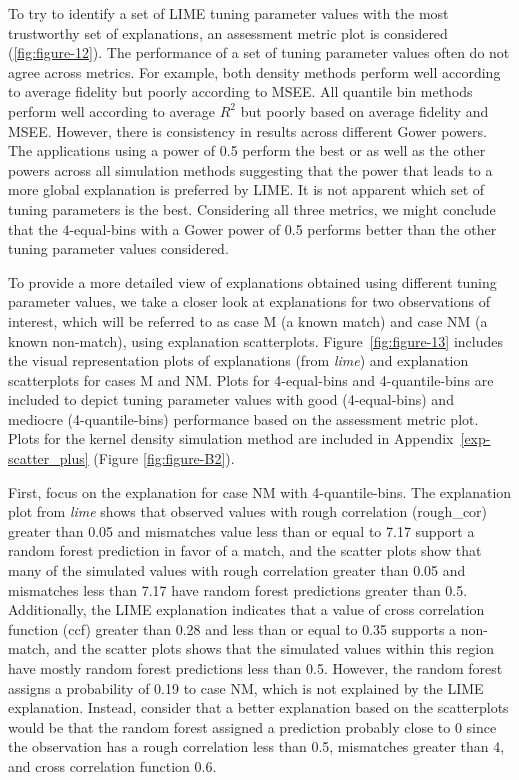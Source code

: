 \documentclass[AMS,STIX2COL]{WileyNJD-v2}\usepackage[]{graphicx}\usepackage[]{color}
\begin{document}
To try to identify a set of LIME tuning parameter values with the most trustworthy set of explanations, an assessment metric plot is considered (\autoref{fig:figure-12}). The performance of a set of tuning parameter values often do not agree across metrics. For example, both density methods perform well according to average fidelity but poorly according to MSEE. All quantile bin methods perform well according to average $R^2$ but poorly based on average fidelity and MSEE. However, there is consistency in results across different Gower powers. The applications using a power of 0.5 perform the best or as well as the other powers across all simulation methods suggesting that the power that leads to a more global explanation is preferred by LIME.  It is not apparent which set of tuning parameters is the best. Considering all three metrics, we might conclude that the 4-equal-bins with a Gower power of 0.5 performs better than the other tuning parameter values considered.

To provide a more detailed view of explanations obtained using different tuning parameter values, we take a closer look at explanations for two observations of interest, which will be referred to as case M (a known match) and case NM (a known non-match), using explanation scatterplots. Figure~\ref{fig:figure-13} includes the visual representation plots of explanations (from \emph{lime}) and explanation scatterplots for cases M and NM. Plots for 4-equal-bins and 4-quantile-bins are included to depict tuning parameter values with good (4-equal-bins) and mediocre (4-quantile-bins) performance based on the assessment metric plot. Plots for the kernel density simulation method are included in Appendix~\ref{exp-scatter_plus} (Figure \ref{fig:figure-B2}). 

First, focus on the explanation for case NM with 4-quantile-bins. The explanation plot from \emph{lime} shows that observed values with rough correlation (rough\_cor) greater than 0.05 and mismatches value less than or equal to 7.17 support a random forest prediction in favor of a match, and the scatter plots show that many of the simulated values with rough correlation greater than 0.05 and mismatches less than 7.17 have random forest predictions greater than 0.5. Additionally, the LIME explanation indicates that a value of cross correlation function (ccf) greater than 0.28 and less than or equal to 0.35 supports a non-match, and the scatter plots shows that the simulated values within this region have mostly random forest predictions less than 0.5.  However, the random forest assigns a probability of 0.19 to case NM, which is not explained by the LIME explanation. Instead, consider that a better explanation based on the scatterplots would be that the random forest assigned a prediction probably close to 0 since the observation has a rough correlation less than 0.5, mismatches greater than 4, and cross correlation function 0.6.
\end{document}
